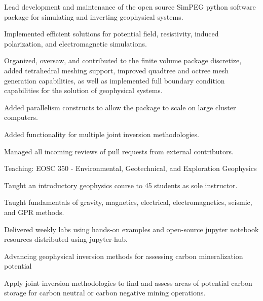 \begin{cventries}
{\begin{cvitems}
        \item {Lead development and maintenance of the open source SimPEG python software package for simulating and inverting geophysical systems.}
        \item {Implemented efficient solutions for potential field, resistivity, induced polarization, and electromagnetic simulations.}
        \item {Organized, oversaw, and contributed to the finite volume package discretize, added tetrahedral meshing support, improved quadtree and octree mesh generation capabilities, as well as implemented full boundary condition capabilities for the solution of geophysical systems.}
        \item {Added parallelism constructs to allow the package to scale on large cluster computers.}
        \item {Added functionality for multiple joint inversion methodologies.}
        \item {Managed all incoming reviews of pull requests from external contributors.}
        \vspace{10pt}
      \end{cvitems}
      \begin{cvparagraph}
      \vspace{7pt}
      Teaching: EOSC 350 - Environmental, Geotechnical, and Exploration Geophysics
      \vspace{7pt}
      \end{cvparagraph}
      \begin{cvitems}
        \item {Taught an introductory geophysics course to 45 students as sole instructor.}
        \item {Taught fundamentals of gravity, magnetics, electrical, electromagnetics, seismic, and GPR methods.}
        \item {Delivered weekly labs using hands-on examples and open-source jupyter notebook resources distributed using jupyter-hub.}
        \vspace{10pt}
      \end{cvitems}
      \begin{cvparagraph}
      \vspace{7pt}
      Advancing geophysical inversion methods for assessing carbon mineralization potential
      \vspace{7pt}
      \end{cvparagraph}
      \begin{cvitems}
        \item {Apply joint inversion methodologies to find and assess areas of potential carbon storage for carbon neutral or carbon negative mining operations.}

\end{cvitems}}
\end{cventries}
